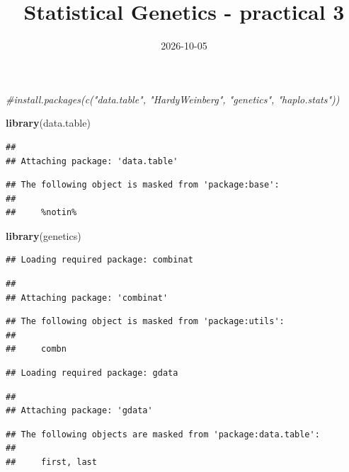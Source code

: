 \documentclass[
]{article}
\title{Statistical Genetics - practical 3}
\author{}
\date{\vspace{-2.5em}2026-10-05}
\newenvironment{Shaded}{\begin{snugshade}}{\end{snugshade}}
\newcommand{\CommentTok}[1]{\textcolor[rgb]{0.56,0.35,0.01}{\textit{#1}}}
\newcommand{\FunctionTok}[1]{\textcolor[rgb]{0.13,0.29,0.53}{\textbf{#1}}}
\newcommand{\NormalTok}[1]{#1}
\begin{document}
\maketitle

\begin{Shaded}
\begin{Highlighting}[]
\CommentTok{\#install.packages(c("data.table", "HardyWeinberg", "genetics", "haplo.stats"))}

\FunctionTok{library}\NormalTok{(data.table)}
\end{Highlighting}
\end{Shaded}

\begin{verbatim}
## 
## Attaching package: 'data.table'
\end{verbatim}

\begin{verbatim}
## The following object is masked from 'package:base':
## 
##     %notin%
\end{verbatim}

\begin{Shaded}
\begin{Highlighting}[]
\FunctionTok{library}\NormalTok{(genetics)}
\end{Highlighting}
\end{Shaded}

\begin{verbatim}
## Loading required package: combinat
\end{verbatim}

\begin{verbatim}
## 
## Attaching package: 'combinat'
\end{verbatim}

\begin{verbatim}
## The following object is masked from 'package:utils':
## 
##     combn
\end{verbatim}

\begin{verbatim}
## Loading required package: gdata
\end{verbatim}

\begin{verbatim}
## 
## Attaching package: 'gdata'
\end{verbatim}

\begin{verbatim}
## The following objects are masked from 'package:data.table':
## 
##     first, last
\end{verbatim}
\end{document}

